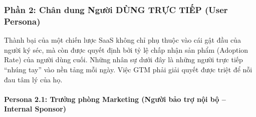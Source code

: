 \subsubsection{Phần 2: Chân dung Người DÙNG TRỰC TIẾP (User Persona)}

Thành bại của một chiến lược SaaS không chỉ phụ thuộc vào cái gật đầu của người ký séc, mà còn được quyết định bởi tỷ lệ chấp nhận sản phẩm (Adoption Rate) của người dùng cuối. Những nhân sự dưới đây là những người trực tiếp ``nhúng tay'' vào nền tảng mỗi ngày. Việc GTM phải giải quyết được triệt để nỗi đau tâm lý của họ.

\paragraph{Persona 2.1: Trưởng phòng Marketing (Người bảo trợ nội bộ -- Internal Sponsor)}


